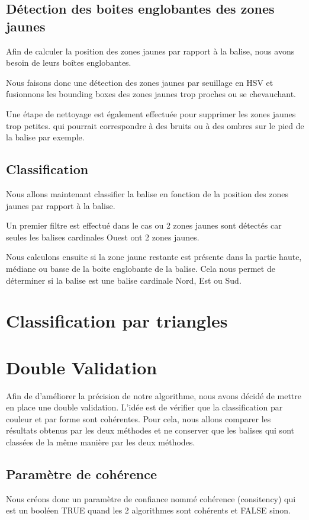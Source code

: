 \documentclass{article}
\begin{document}
\subsection{Détection des boites englobantes des zones jaunes}

Afin de calculer la position des zones jaunes par rapport à la balise, nous
avons besoin de leurs boîtes englobantes.

Nous faisons donc une détection des zones jaunes par seuillage en HSV et
fusionnons les bounding boxes des zones jaunes trop proches ou se chevauchant.

Une étape de nettoyage est également effectuée pour supprimer les zones jaunes
trop petites. qui pourrait correspondre à des bruits ou à des ombres sur le
pied de la balise par exemple.

\subsection{Classification}

Nous allons maintenant classifier la balise en fonction de la position des
zones jaunes par rapport à la balise.

Un premier filtre est effectué dans le cas ou 2 zones jaunes sont détectés car
seules les balises cardinales Ouest ont 2 zones jaunes.

Nous calculons ensuite si la zone jaune restante est présente dans la partie
haute, médiane ou basse de la boite englobante de la balise. Cela nous permet
de déterminer si la balise est une balise cardinale Nord, Est ou Sud.

\section{Classification par triangles}

\section{Double Validation}

Afin de d'améliorer la précision de notre algorithme, nous avons décidé de
mettre en place une double validation. L'idée est de vérifier que la
classification par couleur et par forme sont cohérentes. Pour cela, nous allons
comparer les résultats obtenus par les deux méthodes et ne conserver que les
balises qui sont classées de la même manière par les deux méthodes.

\subsection{Paramètre de cohérence}
Nous créons donc un paramètre de confiance nommé cohérence (consitency) qui est
un booléen TRUE quand les 2 algorithmes sont cohérents et FALSE sinon.
\end{document}
